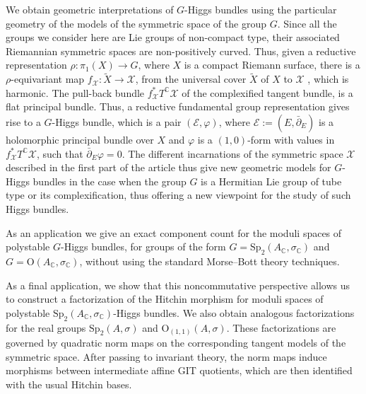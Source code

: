 \documentclass[oneside,11pt]{amsart}
\theoremstyle{definition}
\theoremstyle{remark}
\numberwithin{thm}{section}
\numberwithin{equation}{section}
\begin{document}
We obtain geometric interpretations of $G$-Higgs bundles using the particular geometry of the models of the symmetric space of the group $G$. Since all the groups we consider here are Lie groups of non-compact type, their associated Riemannian symmetric spaces are non-positively curved. 
Thus, given a reductive representation $\rho\colon \pi_1(X) \to G$, where $X$ is a compact Riemann surface, there is a $\rho$-equivariant map 
$f_{\mathcal{X}}\colon \tilde{X} \to \mathcal{X}$, from the universal cover $\tilde{X}$ of $X$ to $\mathcal{X}$ \cite{Corlette, Sagman}, which is harmonic. 
The pull-back bundle
$f^{*}_{\mathcal{X}} T^{\mathbb{C}}\mathcal{X}$ of the complexified tangent bundle, is a flat principal bundle. Thus, a reductive fundamental group representation gives rise to a $G$-Higgs bundle, which is a pair $(\mathcal{E}, \varphi)$, where $\mathcal{E}:=(E, \bar{\partial}_{E})$ is a holomorphic principal bundle over $X$ and $\varphi$ is a $(1,0)$-form with values in $f^{*}_{\mathcal{X}}T^{\mathbb{C}}\mathcal{X}$, such that $\bar{\partial}_{E} \varphi=0$. The different incarnations of the symmetric space $\mathcal{X}$ described in the first part of the article thus give new geometric models for $G$-Higgs bundles in the case when the group $G$ is a Hermitian Lie group of tube type or its complexification, thus offering a new viewpoint for the study of such Higgs bundles. 

As an application we give an exact component count for the moduli spaces of polystable $G$-Higgs bundles, for groups of the form $G=\mathrm{Sp}_2(A_{\mathbb{C}}, \sigma_{\mathbb{C}})$ and $G=\mathrm{O}(A_{\mathbb{C}}, \sigma_{\mathbb{C}})$, without using the standard Morse--Bott theory techniques. 

As a final application, we show that this noncommutative perspective allows us to construct a factorization of the Hitchin morphism for moduli spaces of polystable $\mathrm{Sp}_2(A_{\mathbb C},\sigma_{\mathbb C})$-Higgs bundles. We also obtain analogous factorizations for the real groups $\mathrm{Sp}_2(A,\sigma)$ and $\mathrm{O}_{(1,1)}(A,\sigma)$. These factorizations are governed by quadratic norm maps on the corresponding tangent models of the symmetric space. After passing to invariant theory, the norm maps induce morphisms between intermediate affine GIT quotients, which are then identified with the usual Hitchin bases.





\vspace{3mm}
\end{document}
